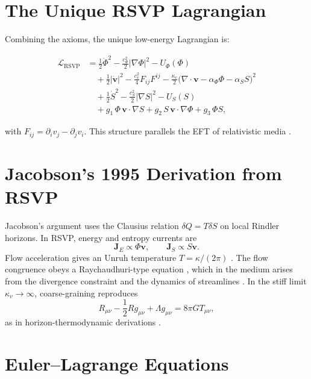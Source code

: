 \documentclass[11pt,a4paper]{article}
\begin{document}
\section{The Unique RSVP Lagrangian}

Combining the axioms, the unique low-energy Lagrangian is:

\[
\boxed{
\begin{aligned}
\mathcal{L}_{\mathrm{RSVP}} &= 
\frac{1}{2}\dot{\Phi}^2 - \frac{c_\Phi^2}{2}|\nabla\Phi|^2 - U_\Phi(\Phi) \\[6pt]
&\quad + \frac{1}{2}|\dot{\mathbf{v}}|^2 - \frac{c_v^2}{4}F_{ij}F^{ij} - \frac{\kappa_v}{2}\bigl(\nabla\!\cdot\!\mathbf{v} - \alpha_\Phi\Phi - \alpha_S S\bigr)^2 \\[6pt]
&\quad + \frac{1}{2}\dot{S}^2 - \frac{c_S^2}{2}|\nabla S|^2 - U_S(S) \\[6pt]
&\quad + g_1\,\Phi\,\mathbf{v}\!\cdot\!\nabla S + g_2\,S\,\mathbf{v}\!\cdot\!\nabla\Phi + g_3\,\Phi S,
\end{aligned}
}
\]

with $F_{ij}=\partial_i v_j - \partial_j v_i$. This structure parallels the EFT of relativistic media \cite{nicolis2013,endlich2013,andersson2007}.

\section{Jacobson’s 1995 Derivation from RSVP}

Jacobson’s argument \cite{jacobson1995} uses the Clausius relation $\delta Q = T\delta S$ on local Rindler horizons. In RSVP, energy and entropy currents are
\[
\mathbf{J}_E \propto \Phi\mathbf{v}, \qquad 
\mathbf{J}_S \propto S\mathbf{v}.
\]
Flow acceleration gives an Unruh temperature $T=\kappa/(2\pi)$ \cite{unruh1976}. The flow congruence obeys a Raychaudhuri-type equation \cite{raychaudhuri1955}, which in the medium arises from the divergence constraint and the dynamics of streamlines \cite{barcelo2005,andersson2007}. In the stiff limit $\kappa_v\to\infty$, coarse-graining reproduces
\[
R_{\mu\nu} - \frac{1}{2}Rg_{\mu\nu} + \Lambda g_{\mu\nu} = 8\pi G T_{\mu\nu},
\]
as in horizon-thermodynamic derivations \cite{padmanabhan2005}.

\appendix

\section{Euler–Lagrange Equations}
\end{document}
